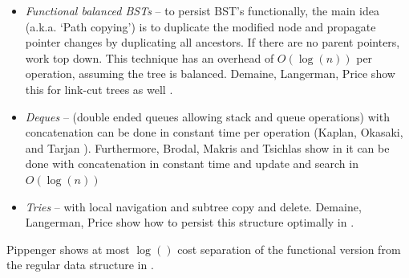 \documentclass[11pt]{article}
\begin{document}
\begin{itemize}
\item {\emph{Functional balanced BSTs}} --  to persist BST's functionally, the main idea (a.k.a. `Path copying') is to duplicate the  modified node and propagate pointer changes by duplicating all ancestors. If there are no parent pointers, work top down. This technique has an overhead of \(O(\log{(n)})\) per operation, assuming the tree is balanced. Demaine, Langerman, Price show this for link-cut trees as well \cite{dlp}.

\item {\emph{Deques}} -- (double ended queues allowing stack and queue operations) with concatenation can be done in constant time per operation (Kaplan, Okasaki, and Tarjan \cite{kot}). Furthermore, Brodal, Makris and Tsichlas show in \cite{bmt} it can  be done with concatenation in constant time and update and search in $O(\log{(n)})$

\item {\emph{Tries}} -- with local navigation and subtree copy and delete. Demaine, Langerman, Price show how to persist this structure optimally in \cite{dlp}.

\end{itemize}

Pippenger shows at most $\log{()}$ cost separation of the functional version from the regular data structure  in \cite{pippenger}.
\end{document}
